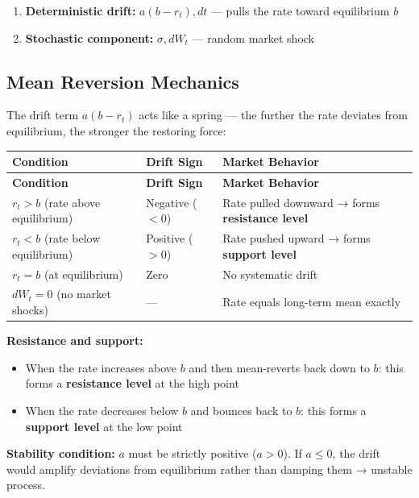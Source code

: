 \documentclass[12pt,openany]{book}
\theoremstyle{definition}
\theoremstyle{remark}
\begin{document}
\begin{enumerate}
\item \textbf{Deterministic drift:} $a(b - r_t) , dt$ --- pulls the rate toward equilibrium $b$


\item \textbf{Stochastic component:} $\sigma , dW_t$ --- random market shock


\end{enumerate}
\medskip
\subsection{Mean Reversion Mechanics}
The drift term $a(b - r_t)$ acts like a spring --- the further the rate deviates from equilibrium, the stronger the restoring force:

\begingroup
\footnotesize
\begin{longtable}{@{}L{0.19\textwidth}L{0.36\textwidth}L{0.36\textwidth}@{}}
\toprule
\textbf{Condition} & \textbf{Drift Sign} & \textbf{Market Behavior} \\
\midrule
\endfirsthead
\toprule
\textbf{Condition} & \textbf{Drift Sign} & \textbf{Market Behavior} \\
\midrule
\endhead
$r_t > b$ (rate above equilibrium) & Negative ($< 0$) & Rate pulled downward → forms \textbf{resistance level} \\
$r_t < b$ (rate below equilibrium) & Positive ($> 0$) & Rate pushed upward → forms \textbf{support level} \\
$r_t = b$ (at equilibrium) & Zero & No systematic drift \\
$dW_t = 0$ (no market shocks) & --- & Rate equals long-term mean exactly \\
\bottomrule
\end{longtable}
\endgroup
\textbf{Resistance and support:}

\begin{itemize}
\item When the rate increases above $b$ and then mean-reverts back down to $b$: this forms a \textbf{resistance level} at the high point


\item When the rate decreases below $b$ and bounces back to $b$: this forms a \textbf{support level} at the low point


\end{itemize}
\textbf{Stability condition:} $a$ must be strictly positive ($a > 0$). If $a \leq 0$, the drift would amplify deviations from equilibrium rather than damping them → unstable process.
\end{document}
